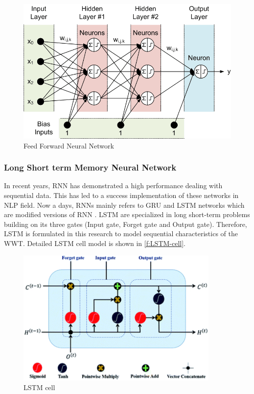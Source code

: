 \begin{figure}[h]
\centering
\includegraphics[width=12cm]{figures/Ch2/FFNN.png}
\caption{Feed Forward Neural Network}
\label{f:FFNN}
\end{figure}

\subsubsection{Long Short term Memory Neural Network}
In recent years, \ac{RNN} has demonstrated a high performance dealing with sequential data. This has led to a success implementation of these networks in \ac{NLP} field.
Now a days, \ac{RNN}s mainly refers to \ac{GRU} and \ac{LSTM} networks which are modified versions of \ac{RNN} \cite{Guo2020}. \ac{LSTM} are specialized in long short-term problems building on its three gates (Input gate, Forget gate and Output gate). Therefore, LSTM is formulated in this research to model sequential characteristics of the \ac{WWT}. Detailed \ac{LSTM} cell model is shown in \autoref{f:LSTM-cell}.

\begin{figure}[h]
\centering
\includegraphics[width=10cm]{figures/Ch2/LSTM_cell.png}
\caption{LSTM cell \cite{Guo2020}}
\label{f:LSTM-cell}
\end{figure}


